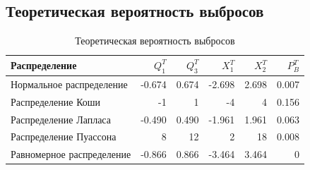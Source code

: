 \subsection{Теоретическая вероятность выбросов}
	\begin{table}[H]
		\centering
		\begin{tabular}[t]{lrrrrr}
			\hline
			Распределение   &      $Q_1^T$	& $Q_3^T$ & $X_1^T$ & $X_2^T$ & $P_B^T$	\\
			\hline
			Нормальное распределение 	& -0.674& 0.674 & -2.698 	&  2.698 	& 0.007 \\
			Распределение Коши 			& -1	& 1		&  -4		& 4			& 0.156 \\
			Распределение Лапласа 		&-0.490	& 0.490	& -1.961	& 1.961		& 0.063\\
			Распределение Пуассона 		& 8		& 12	& 2			& 18		& 0.008 \\
			Равномерное распределение 	&-0.866 & 0.866	& -3.464 	& 3.464 	& 0	\\
			
			\hline
		\end{tabular}
		\caption{Теоретическая вероятность выбросов}
		\label{tab:normal}
	\end{table}
